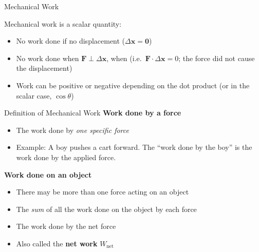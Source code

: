\documentclass[12pt,compress,aspectratio=169]{beamer}
\begin{document}
\begin{frame}{Mechanical Work}

  Mechanical work is a scalar quantity:
  
  
%
  \begin{itemize}
  \item No work done if no displacement ($\Delta\bm{x}=\bm{0}$)
  \item No work done when $\bm{F}\perp\Delta\bm{x}$, when (i.e.\
    $\bm{F}\cdot\Delta\bm{x}=0$; the force did not cause the displacement)
  \item Work can be positive or negative depending on the dot product (or in
    the scalar case, $\cos\theta$)
  \end{itemize}
\end{frame}



%
%
%




\begin{frame}{Definition of Mechanical Work}
  \textbf{Work done by a force}
  \begin{itemize}
  \item The work done by \emph{one specific force}
  \item Example: A boy pushes a cart forward. The ``work done by the boy'' is
    the work done by the applied force.
  \end{itemize}

  \vspace{.15in}\textbf{Work done on an object}
  \begin{itemize}
  \item There may be more than one force acting on an object
  \item The \emph{sum} of all the work done on the object by each force
  \item The work done by the net force
  \item Also called the \textbf{net work} $W_\text{net}$
  \end{itemize}
\end{frame}
\end{document}
